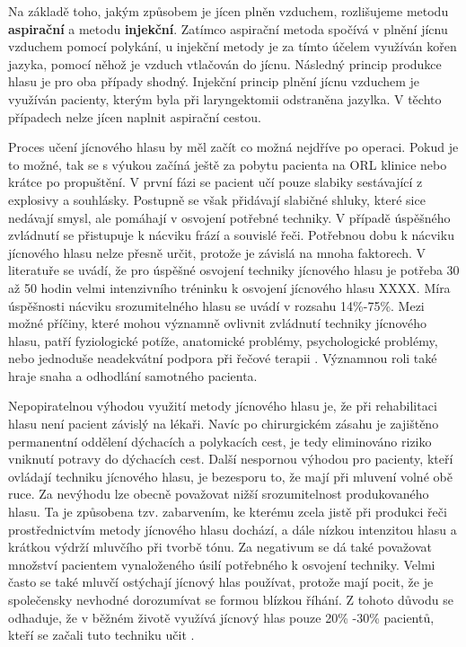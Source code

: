 Na základě toho, jakým způsobem je jícen plněn vzduchem, rozlišujeme metodu \textbf{aspirační} a metodu \textbf{injekční}. Zatímco aspirační metoda spočívá v plnění jícnu vzduchem pomocí polykání, u injekční metody je za tímto účelem využíván kořen jazyka, pomocí něhož je vzduch vtlačován do jícnu. Následný princip produkce hlasu je pro oba případy shodný. Injekční princip plnění jícnu vzduchem je využíván pacienty, kterým byla
při laryngektomii odstraněna jazylka. V těchto případech nelze jícen naplnit aspirační cestou.

Proces učení jícnového hlasu by měl začít co možná nejdříve po operaci. Pokud
je to možné, tak se s výukou začíná ještě za pobytu pacienta na ORL klinice
nebo krátce po propuštění. V první fázi se pacient učí pouze slabiky
sestávající z explosivy a souhlásky. Postupně se však přidávají slabičné
shluky, které sice nedávají smysl, ale pomáhají v osvojení potřebné techniky.
V případě úspěšného zvládnutí se přistupuje k nácviku frází a souvislé řeči.
Potřebnou dobu k nácviku jícnového hlasu nelze přesně určit, protože je
závislá na mnoha faktorech. V literatuře se uvádí, že pro úspěšné osvojení techniky jícnového hlasu je potřeba 30 až 50 hodin velmi intenzivního tréninku k osvojení jícnového hlasu XXXX. Míra úspěšnosti nácviku srozumitelného hlasu se uvádí v rozsahu 14\%-75\%. %
Mezi možné příčiny, které mohou významně ovlivnit zvládnutí techniky jícnového hlasu, patří
fyziologické potíže, anatomické problémy, psychologické problémy, nebo jednoduše
neadekvátní podpora při řečové terapii \cite{Brown2003}. Významnou roli také
hraje snaha a odhodlání samotného pacienta.

Nepopiratelnou výhodou využití metody jícnového hlasu je, že při rehabilitaci hlasu není pacient závislý na lékaři. Navíc po chirurgickém zásahu je zajištěno permanentní oddělení dýchacích a
polykacích cest, je tedy eliminováno riziko vniknutí potravy do dýchacích cest. 
Další nespornou výhodou pro pacienty, kteří ovládají techniku jícnového hlasu, je bezesporu to, že mají při mluvení
volné obě ruce. Za nevýhodu lze obecně považovat nižší srozumitelnost produkovaného hlasu. 
Ta je způsobena tzv.  zabarvením, ke kterému zcela jistě při produkci řeči prostřednictvím metody jícnového hlasu  dochází, a dále nízkou intenzitou hlasu a krátkou výdrží mluvčího při tvorbě tónu. Za negativum se dá také považovat množství pacientem vynaloženého úsilí potřebného k osvojení
techniky. Velmi často se také mluvčí ostýchají jícnový hlas používat, protože
mají pocit, že je společensky nevhodné dorozumívat se formou blízkou říhání. Z
tohoto důvodu se odhaduje, že v běžném životě využívá jícnový hlas pouze 20\% -30\% 
pacientů, kteří se začali tuto techniku učit \cite{Hradecka2007}.

